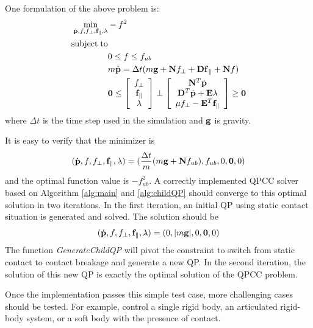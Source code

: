 One formulation of the above problem is:
\begin{align}
\label{eqn:testCase}
\nonumber \min_{\dot{\mathbf{p}}, f,f_\perp,\mathbf{f}_\parallel,\lambda}& -f^2  \\
\nonumber  \mathrm{subject\;} \mathrm{to} &\\
\nonumber &0 \leq f \leq f_{ub}\\
\nonumber &m\dot{\mathbf{p}} = \Delta t(m\mathbf{g}+\mathbf{N}f_{\perp}+\mathbf{Df}_{\parallel}+\mathbf{N}f) \\
\nonumber &\mathbf{0} \leq \left[ \begin{array}{c} f_\perp \\ \mathbf{f}_\parallel \\ \lambda \end{array} \right] \perp
 \left[ \begin{array}{c} \mathbf{N}^T\dot{\mathbf{p}} \\ \mathbf{D}^T \dot{\mathbf{p}} + \mathbf{E} \lambda \\ \mu f_\perp - \mathbf{E}^T \mathbf{f}_\parallel \end{array} \right] \geq \mathbf{0}
\end{align}
where $\Delta t$ is the time step used in the simulation and $\mathbf{g}$ is gravity.

It is easy to verify that the minimizer is
\begin{displaymath}
(\dot{\mathbf{p}},f,f_\perp,\mathbf{f}_\parallel,\lambda)=(\frac{\Delta t}{m}(m\mathbf{g}+\mathbf{N}f_{ub}), f_{ub}, 0, \mathbf{0}, 0)
\end{displaymath}
and the optimal function value is $-f_{ub}^2$. A correctly implemented QPCC solver based on Algorithm \ref{alg:main} and \ref{alg:childQP} should converge to this optimal solution in two iterations. In the first iteration, an initial QP using static contact situation is generated and solved. The solution should be
\begin{displaymath}
(\dot{\mathbf{p}},f,f_\perp,\mathbf{f}_\parallel,\lambda)=(0, |m\mathbf{g}|, 0, \mathbf{0}, 0)
\end{displaymath}
The function \emph{GenerateChildQP} will pivot the constraint to switch from static contact to contact breakage and generate a new QP. In the second iteration, the solution of this new QP is exactly the optimal solution of the QPCC problem.

Once the implementation passes this simple test case, more challenging cases should be tested. For example, control a single rigid body, an articulated rigid-body system, or a soft body with the presence of contact.

